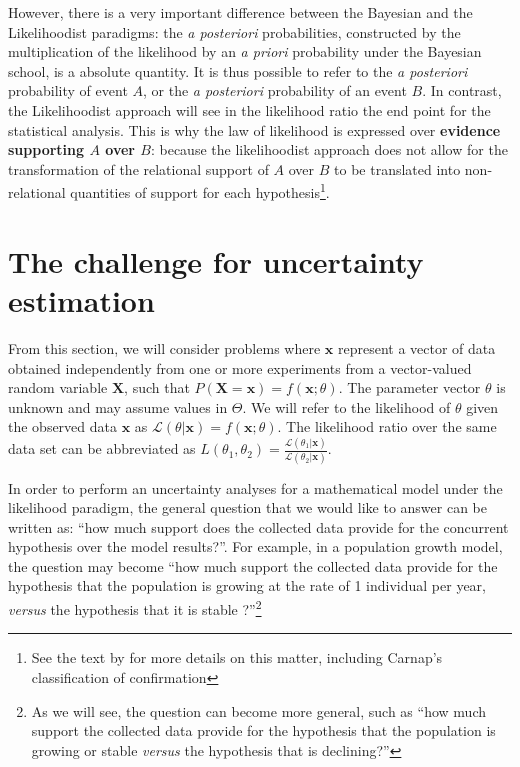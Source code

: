\documentclass[twoside,12pt,a4paper]{article}
\newcommand{\bu}[1]{\mbox{$\mathbf{#1}$}}
\begin{document}
However, there is a very important difference between the Bayesian and the Likelihoodist paradigms:
the {\em a posteriori} probabilities, constructed by the multiplication of the likelihood by an {\em a priori}
probability under the Bayesian school, is a absolute quantity. It is thus possible to refer to the {\em
a posteriori} probability of event $A$, or the {\em a posteriori} probability of an event $B$. In contrast,
the Likelihoodist approach will see in the likelihood ratio the end point for the statistical analysis. 
This is why the law of likelihood is expressed over {\bf evidence supporting $A$ over $B$}: because the
likelihoodist approach does not allow for the transformation of the relational support of $A$ over $B$ to
be translated into non-relational quantities of support for each hypothesis\footnote{See the text by
\citep{Fitelson07} for more details on this matter, including Carnap's classification of confirmation}.

\section{The challenge for uncertainty estimation}
From this section, we will consider problems where $\bu{x}$ represent a vector of data obtained independently
from one or more experiments from a vector-valued random variable $\bu{X}$, such that $P(\bu{X}\!=\!\bu{x}) = f(\bu{x};\theta)$. The parameter vector $\theta$ is unknown and may assume values in $\Theta$. We will
refer to the likelihood of $\theta$ given the observed data $\bu{x}$ as 
$\mathcal{L} (\theta | \bu{x}) = f(\bu{x}; \theta)$. The likelihood ratio over the same 
data set can be abbreviated as
$L(\theta_1, \theta_2) = \frac{\mathcal{L}(\theta_1|\bu{x})} {\mathcal{L}(\theta_2|\bu{x})}$. 

In order to perform an uncertainty analyses for a mathematical model under the likelihood paradigm, the 
general question that we would like to answer can be written as: ``how much support does the collected data
provide for the concurrent hypothesis over the model results?''. For example, in a population growth model,
the question may become ``how much support the collected data provide for the hypothesis that
the population is growing at the rate of 1 individual per year, {\em versus} the hypothesis that it is stable
?''\footnote{As we will see, the question can become more general, such as ``how much support the collected
data provide for the hypothesis that the population is growing or stable {\em versus} the hypothesis that is
declining?''}
\end{document}
